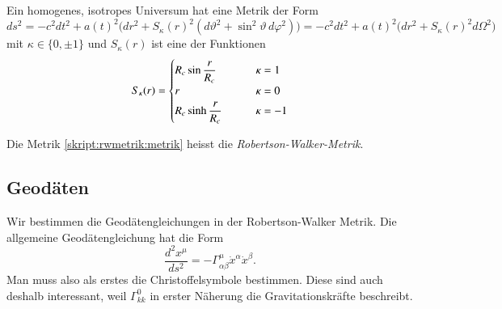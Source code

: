 \begin{satz}
Ein homogenes, isotropes Universum hat eine Metrik der Form
\begin{equation}
ds^2
=
-c^2 dt^2 + a(t)^2\bigl(
dr^2 + S_\kappa(r)^2(d\vartheta^2 + \sin^2\vartheta\, d\varphi^2)
\bigr)
=
-c^2 dt^2 + a(t)^2\bigl(
dr^2 + S_\kappa(r)^2 d\Omega^2
\bigr)
\label{skript:rwmetrik:metrik}
\end{equation}
mit $\kappa\in\{0,\pm1\}$ und 
$S_\kappa(r)$ ist eine der Funktionen
\[
S_\kappa(r)
=
\begin{cases}
R_c\sin \displaystyle\frac{\mathstrut r}{R_c}&\qquad \kappa= 1\\
r&\qquad \kappa=0\\
R_c\sinh\displaystyle\frac{\mathstrut r}{R_c}&\qquad \kappa=-1
\end{cases}
\]
\end{satz}
Die Metrik \eqref{skript:rwmetrik:metrik} heisst die
{\em Robertson-Walker-Metrik}.

\subsection{Geodäten}
Wir bestimmen die Geodätengleichungen in der Robertson-Walker Metrik.
Die allgemeine Geodätengleichung hat die Form
\[
\frac{d^2x^\mu}{ds^2} = -\Gamma^\mu_{\alpha\beta} \dot x^\alpha \dot x^\beta.
\]
Man muss also als erstes die Christoffelsymbole bestimmen.  
Diese sind auch deshalb interessant, weil $\Gamma^0_{kk}$ in erster
Näherung die Gravitationskräfte beschreibt.

